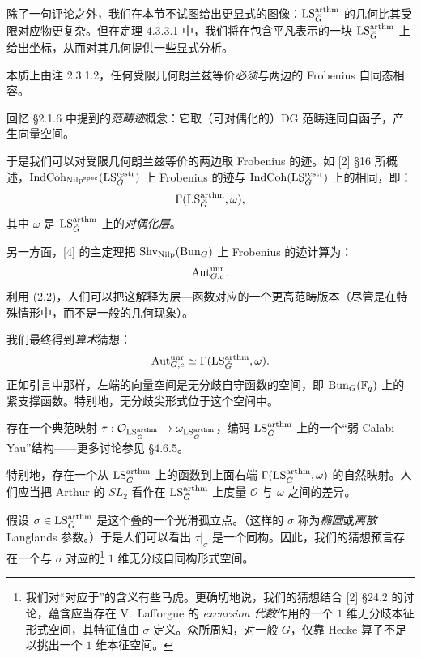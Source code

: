 \begin{remark}
除了一句评论之外，我们在本节不试图给出更显式的图像：$\mathrm{LS}^{\mathrm{arthm}}_{\check{G}}$ 的几何比其受限对应物更复杂。但在定理 4.3.3.1 中，我们将在包含平凡表示的一块 $\mathrm{LS}^{\mathrm{arthm}}_{\check{G}}$ 上给出坐标，从而对其几何提供一些显式分析。
\end{remark}

\pnum{}本质上由注 2.3.1.2，任何受限几何朗兰兹等价\emph{必须}与两边的 Frobenius 自同态相容。

回忆 §2.1.6 中提到的\emph{范畴迹}概念：它取（可对偶化的）DG 范畴连同自函子，产生向量空间。

于是我们可以对受限几何朗兰兹等价的两边取 Frobenius 的迹。如 [2] §16 所概述，$\mathrm{IndCoh}_{\mathrm{Nilp}^{\mathrm{spec}}}(\mathrm{LS}^{\mathrm{restr}}_{\check{G}})$ 上 Frobenius 的迹与 $\mathrm{IndCoh}(\mathrm{LS}^{\mathrm{restr}}_{\check{G}})$ 上的相同，即：
\[
  \Gamma(\mathrm{LS}^{\mathrm{arthm}}_{\check{G}}, \omega),
\]
其中 $\omega$ 是 $\mathrm{LS}^{\mathrm{arthm}}_{\check{G}}$ 上的\emph{对偶化层}。

另一方面，[4] 的主定理把 $\mathrm{Shv}_{\mathrm{Nilp}}(\mathrm{Bun}_G)$ 上 Frobenius 的迹计算为：
\[
  \operatorname{Aut}^{\mathrm{unr}}_{G,c}.
\]
利用 (2.2)，人们可以把这解释为层—函数对应的一个更高范畴版本（尽管是在特殊情形中，而不是一般的几何现象）。

\pnum{}我们最终得到\emph{算术}猜想：
\[
  \operatorname{Aut}^{\mathrm{unr}}_{G,c} \simeq \Gamma(\mathrm{LS}^{\mathrm{arthm}}_{\check{G}}, \omega).
\]
正如引言中那样，左端的向量空间是无分歧自守函数的空间，即 $\mathrm{Bun}_G(\mathbb{F}_q)$ 上的紧支撑函数。特别地，无分歧尖形式位于这个空间中。

\pnum{}存在一个典范映射 $\tau: \mathcal{O}_{\mathrm{LS}^{\mathrm{arthm}}_{\check{G}}} \to \omega_{\mathrm{LS}^{\mathrm{arthm}}_{\check{G}}}$，编码 $\mathrm{LS}^{\mathrm{arthm}}_{\check{G}}$ 上的一个“弱 Calabi--Yau”结构——更多讨论参见 §4.6.5。

特别地，存在一个从 $\mathrm{LS}^{\mathrm{arthm}}_{\check{G}}$ 上的函数到上面右端 $\Gamma(\mathrm{LS}^{\mathrm{arthm}}_{\check{G}}, \omega)$ 的自然映射。人们应当把 Arthur 的 $SL_2$ 看作在 $\mathrm{LS}^{\mathrm{arthm}}_{\check{G}}$ 上度量 $\mathcal{O}$ 与 $\omega$ 之间的差异。

\begin{example}
假设 $\sigma \in \mathrm{LS}^{\mathrm{arthm}}_{\check{G}}$ 是这个叠的一个光滑孤立点。（这样的 $\sigma$ 称为\emph{椭圆}或\emph{离散} Langlands 参数。）于是人们可以看出 $\tau|_\sigma$ 是一个同构。因此，我们的猜想预言存在一个与 $\sigma$ 对应的\footnote{我们对“对应于”的含义有些马虎。更确切地说，我们的猜想结合 [2] §24.2 的讨论，蕴含应当存在 V.~Lafforgue 的 \emph{excursion 代数}作用的一个 $1$ 维无分歧本征形式空间，其特征值由 $\sigma$ 定义。众所周知，对一般 $G$，仅靠 Hecke 算子不足以挑出一个 $1$ 维本征空间。} $1$ 维无分歧自同构形式空间。
\end{example}

